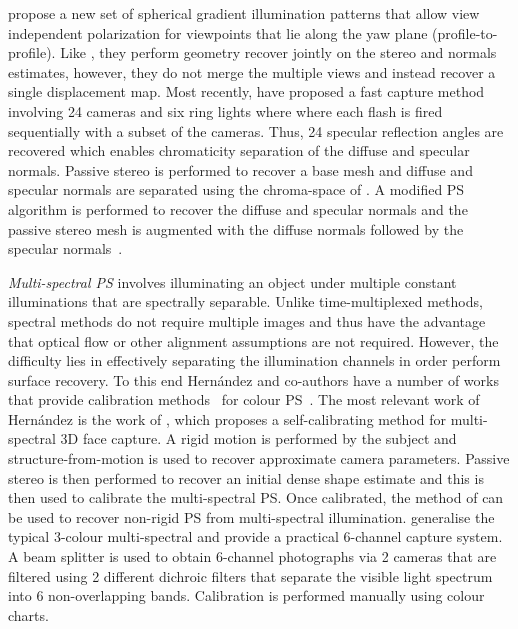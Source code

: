 \citet{ghosh2011multiview} propose a new set of spherical gradient
illumination patterns that allow view independent polarization
for viewpoints that lie along the yaw plane (profile-to-profile). Like
\citet{fyffe2011comprehensive}, they perform geometry recover jointly
on the stereo and normals estimates, however, they do not merge the multiple
views and instead recover a single displacement map. Most recently,
\citet{graham2015near} have proposed a fast capture method involving 24 cameras
and six ring lights where where each flash is fired sequentially with a subset
of the cameras. Thus, 24 specular reflection angles are recovered which
enables chromaticity separation of the diffuse and specular normals. Passive
stereo is performed to recover a base mesh and diffuse and specular normals
are separated using the chroma-space of \citet{zickler2008color}. A modified
PS algorithm is performed to recover the diffuse and specular normals and
the passive stereo mesh is augmented with the diffuse normals followed
by the specular normals~\cite{nehab2005efficiently}.

\textit{Multi-spectral PS} involves illuminating an object under
multiple constant illuminations that are spectrally separable. Unlike
time-multiplexed methods, spectral methods do not require multiple images
and thus have the advantage that optical flow or other alignment assumptions
are not required. However, the difficulty lies in effectively separating the
illumination channels in order perform surface recovery. To this end
Hern{\'a}ndez and co-authors have a number of works that provide
calibration methods~\cite{vogiatzis2012self,hernandez2008multiview,brostow2011video}
for colour PS~\cite{drew1992shape}. The most relevant work of Hern{\'a}ndez
is the work of \citet{vogiatzis2012self}, which proposes a self-calibrating
method for multi-spectral 3D face capture. A rigid motion is performed by
the subject and structure-from-motion is used to recover approximate camera
parameters. Passive stereo is then performed to recover an initial dense
shape estimate and this is then used to calibrate the multi-spectral PS.\@
Once calibrated, the method of \citet{brostow2011video} can be used to
recover non-rigid PS from multi-spectral illumination.
\citet{fyffe2011single} generalise the typical 3-colour multi-spectral
and provide a practical 6-channel capture system. A beam splitter is used
to obtain 6-channel photographs via 2 cameras that are filtered using
2 different dichroic filters that separate the visible light spectrum
into 6 non-overlapping bands. Calibration is performed manually using colour
charts.

